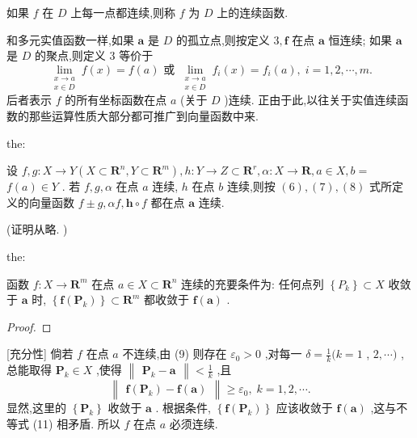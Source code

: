 如果 \(f\) 在 \(D\) 上每一点都连续,则称 \(f\) 为 \(D\) 上的连续函数.

和多元实值函数一样,如果 \(\mathbf{a}\) 是 \(D\) 的孤立点,则按定义 \(3,\mathbf{f}\) 在点 \(\mathbf{a}\) 恒连续; 如果 \(\mathbf{a}\) 是 \(D\) 的聚点,则定义 3 等价于
\[
\mathop{\lim }\limits_{\substack{{x \rightarrow  a} \\  {x \in  D} }}f\left( x\right)  = f\left( a\right) \text{ 或 }\mathop{\lim }\limits_{\substack{{x \rightarrow  a} \\  {x \in  D} }}{f}_{i}\left( x\right)  = {f}_{i}\left( a\right) ,\;i = 1,2,\cdots ,m.
\]
后者表示 \(f\) 的所有坐标函数在点 \(a\) (关于 \(D\) )连续. 正由于此,以往关于实值连续函数的那些运算性质大部分都可推广到向量函数中来.

\begin{theorem}{}{the:}

\end{theorem}
 设 \(f,g : X \rightarrow  Y\left( {X \subset  {\mathbf{R}}^{n},Y \subset  {\mathbf{R}}^{m}}\right) ,h : Y \rightarrow  Z \subset  {\mathbf{R}}^{r},\alpha  : X \rightarrow  \mathbf{R},a \in  X,b =\)  \(f\left( a\right)  \in  Y\) . 若 \(f,g,\alpha\) 在点 \(a\) 连续, \(h\) 在点 \(b\) 连续,则按 \(\left( 6\right) ,\left( 7\right) ,\left( 8\right)\) 式所定义的向量函数 \(f \pm  g,{\alpha f},\mathbf{h} \circ  f\) 都在点 \(\mathbf{a}\) 连续.

(证明从略. )

\begin{theorem}{}{the:}

\end{theorem}
 函数 \(f : X \rightarrow  {\mathbf{R}}^{m}\) 在点 \(a \in  X \subset  {\mathbf{R}}^{n}\) 连续的充要条件为: 任何点列 \(\left\{  {P}_{k}\right\}   \subset  X\) 收敛于 \(\mathbf{a}\) 时, \(\left\{  {\mathbf{f}\left( {\mathbf{P}}_{k}\right) }\right\}   \subset  {\mathbf{R}}^{m}\) 都收敛于 \(\mathbf{f}\left( \mathbf{a}\right)\) .

\begin{proof}

\end{proof}
[充分性] 倘若 \(f\) 在点 \(a\) 不连续,由 (9) 则存在 \({\varepsilon }_{0} > 0\) ,对每一 \(\delta  = \frac{1}{k}(k = 1\) , \(2,\cdots )\) ,总能取得 \({\mathbf{P}}_{k} \in  X\) ,使得 \(\begin{Vmatrix}{{\mathbf{P}}_{k} - \mathbf{a}}\end{Vmatrix} < \frac{1}{k}\) ,且
\[
\begin{Vmatrix}{\mathbf{f}\left( {\mathbf{P}}_{k}\right)  - \mathbf{f}\left( \mathbf{a}\right) }\end{Vmatrix} \geq  {\varepsilon }_{0},\;k = 1,2,\cdots . \tag{11}
\]
显然,这里的 \(\left\{  {\mathbf{P}}_{k}\right\}\) 收敛于 \(\mathbf{a}\) . 根据条件, \(\left\{  {\mathbf{f}\left( {\mathbf{P}}_{k}\right) }\right\}\) 应该收敛于 \(\mathbf{f}\left( \mathbf{a}\right)\) ,这与不等式 (11) 相矛盾. 所以 \(f\) 在点 \(a\) 必须连续.

